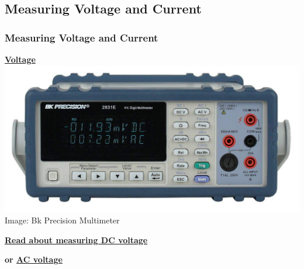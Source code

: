 \documentclass[fleqn]{beamer} %
\newcommand{\sectionIsubsectionIIItitle}{Measuring Voltage and Current}
\begin{document}
		\subsection{\sectionIsubsectionIIItitle}\label{sectionIsubsectionIII}
			\begin{frame} 
				\frametitle{\sectionIsubsectionIIItitle}
				\underline{{\bf \large Voltage}} \vspace{10mm}\\ 

				\includegraphics[scale=.13]{images/bk_2831e.jpg}
				\vspace{10mm}
				\tiny{Image: Bk Precision Multimeter }

				\textbf{ \href{https://www.fluke.com/en-us/learn/best-practices/test-tools-basics/digital-multimeters/how-to-measure-dc-voltage-with-a-digital-multimeter}{Read about measuring DC voltage} }

				\textbf{or \href{https://www.fluke.com/en-us/learn/best-practices/test-tools-basics/digital-multimeters/how-to-measure-ac-voltage-with-a-digital-multimeter}{ AC voltage} }

			\end{frame}	
\end{document}
